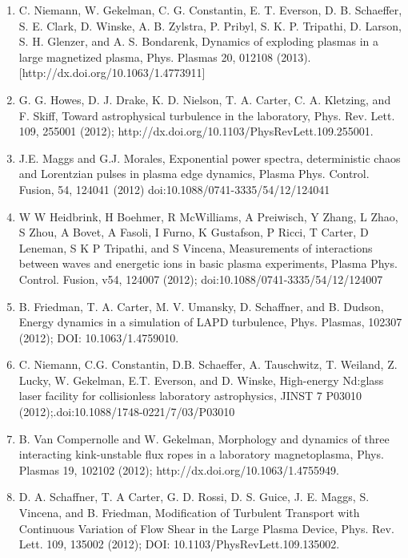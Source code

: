 \documentclass[11pt]{article}
\begin{document}
\begin{enumerate}
\item   C. Niemann, W. Gekelman, C. G. Constantin, E. T. Everson, D. B. Schaeffer, S. E. Clark, D. Winske, A. B. Zylstra, P. Pribyl, S. K. P. Tripathi, D. Larson, S. H. Glenzer, and A. S. Bondarenk, Dynamics of exploding plasmas in a large magnetized plasma, Phys. Plasmas 20, 012108 (2013). [http://dx.doi.org/10.1063/1.4773911]

\item   G. G. Howes, D. J. Drake, K. D. Nielson, T. A. Carter, C. A. Kletzing, and F. Skiff, Toward astrophysical turbulence in the laboratory, Phys. Rev. Lett. 109, 255001 (2012); http://dx.doi.org/10.1103/PhysRevLett.109.255001.

\item   J.E. Maggs and G.J. Morales, Exponential power spectra, deterministic chaos and Lorentzian pulses in plasma edge dynamics, Plasma Phys. Control. Fusion, 54, 124041 (2012) doi:10.1088/0741-3335/54/12/124041

\item W W Heidbrink, H Boehmer, R McWilliams, A Preiwisch, Y Zhang, L Zhao, S Zhou, A Bovet, A Fasoli, I Furno, K Gustafson, P Ricci, T Carter, D Leneman, S K P Tripathi, and S Vincena, Measurements of interactions between waves and energetic ions in basic plasma experiments, Plasma Phys. Control. Fusion, v54, 124007 (2012); doi:10.1088/0741-3335/54/12/124007

\item  B. Friedman, T. A. Carter, M. V. Umansky, D. Schaffner, and B. Dudson, Energy dynamics in a simulation of LAPD turbulence, Phys. Plasmas, 102307 (2012); DOI: 10.1063/1.4759010.

\item  C. Niemann, C.G. Constantin, D.B. Schaeffer, A. Tauschwitz, T. Weiland, Z. Lucky, W. Gekelman, E.T. Everson, and D. Winske, High-energy Nd:glass laser facility for collisionless laboratory astrophysics, JINST 7 P03010 (2012);.doi:10.1088/1748-0221/7/03/P03010

\item B. Van Compernolle and W. Gekelman, Morphology and dynamics of three interacting kink-unstable flux ropes in a laboratory magnetoplasma, Phys. Plasmas 19, 102102 (2012); http://dx.doi.org/10.1063/1.4755949.

\item D. A. Schaffner, T. A Carter, G. D. Rossi, D. S. Guice, J. E. Maggs, S. Vincena, and B. Friedman, Modification of Turbulent Transport with Continuous Variation of Flow Shear in the Large Plasma Device, Phys. Rev. Lett. 109, 135002 (2012); DOI: 10.1103/PhysRevLett.109.135002.


\end{enumerate}
\end{document}
